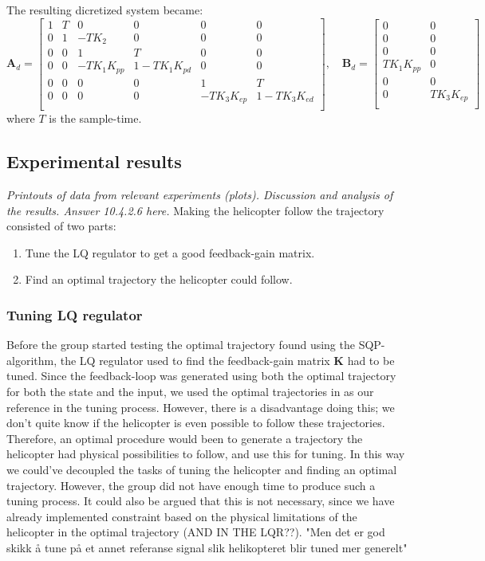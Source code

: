 \documentclass[../main.tex]{subfiles}
\begin{document}
The resulting dicretized system became: 
\begin{equation}\label{eq:lab4_disc_ss}
	\bm A_d = \begin{bmatrix}
		1 & T & 0 & 0 & 0 & 0\\
		0 & 1 & -TK_2 & 0 & 0 & 0\\
		0 & 0 & 1 & T & 0 & 0\\
		0 & 0 & -T K_1 K_{pp} &  1 - T K_1 K_{pd} & 0 & 0\\
		0 & 0 & 0 & 0 & 1 & T \\
		0 & 0 & 0 & 0 & -T K_3 K_{ep} & 1 - TK_3K_{ed} \\
	\end{bmatrix}, \quad
	\bm B_d = \begin{bmatrix}
		0 & 0 \\
		0 & 0\\
		0 & 0\\
		T K_1 K_{pp} & 0\\
		0 & 0 \\
		0 & T K_3K_{ep} \\
	\end{bmatrix}
\end{equation}
where $ T $ is the sample-time.

\subsection{Experimental results}
\textit{Printouts of data from relevant experiments (plots).
Discussion and analysis of the results.
Answer 10.4.2.6 here.}
Making the helicopter follow the trajectory consisted of two parts: 
\begin{enumerate}
	\item Tune the LQ regulator to get a good feedback-gain matrix.
	\item Find an optimal trajectory the helicopter could follow.
\end{enumerate}

\subsubsection{Tuning LQ regulator}
Before the group started testing the optimal trajectory found using the SQP-algorithm, the LQ regulator used to find the feedback-gain matrix $\bm K$ had to be tuned. Since the feedback-loop was generated using both the optimal trajectory for both the state and the input, we used the optimal trajectories in as our reference in the tuning process. However, there is a disadvantage doing this; we don't quite know if the helicopter is even possible to follow these trajectories. Therefore, an optimal procedure would been to generate a trajectory the helicopter had physical possibilities to follow, and use this for tuning. In this way we could've decoupled the tasks of tuning the helicopter and finding an optimal trajectory. However, the group did not have enough time to produce such a tuning process. It could also be argued that this is not necessary, since we have already implemented constraint based on the physical limitations of the helicopter in the optimal trajectory (AND IN THE LQR??). "Men det er god skikk å tune på et annet referanse signal slik helikopteret blir tuned mer generelt"
\end{document}
